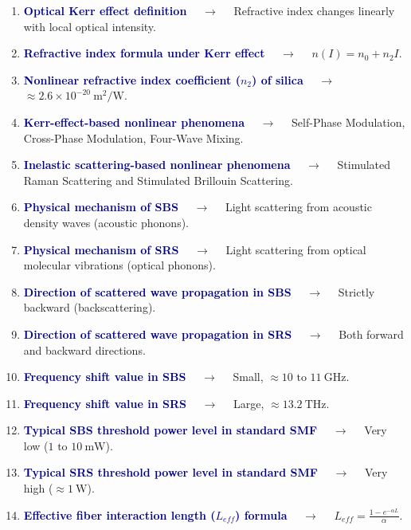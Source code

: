 \documentclass[11pt,a4paper]{article}
\begin{document}
\begin{enumerate}[label=\arabic*., leftmargin=*, labelsep=0.8em, itemsep=0.35em, parsep=0.1em, topsep=0.2em]
  \item \textcolor{darkblue}{\textbf{Optical Kerr effect definition}} $\quad\to\quad$ Refractive index changes linearly with local optical intensity.
  \item \textcolor{darkblue}{\textbf{Refractive index formula under Kerr effect}} $\quad\to\quad$ $n(I) = n_0 + n_2 I$.
  \item \textcolor{darkblue}{\textbf{Nonlinear refractive index coefficient ($n_2$) of silica}} $\quad\to\quad$ $\approx 2.6 \times 10^{-20}\ \text{m}^2/\text{W}$.
  \item \textcolor{darkblue}{\textbf{Kerr-effect-based nonlinear phenomena}} $\quad\to\quad$ Self-Phase Modulation, Cross-Phase Modulation, Four-Wave Mixing.
  \item \textcolor{darkblue}{\textbf{Inelastic scattering-based nonlinear phenomena}} $\quad\to\quad$ Stimulated Raman Scattering and Stimulated Brillouin Scattering.
  \item \textcolor{darkblue}{\textbf{Physical mechanism of SBS}} $\quad\to\quad$ Light scattering from acoustic density waves (acoustic phonons).
  \item \textcolor{darkblue}{\textbf{Physical mechanism of SRS}} $\quad\to\quad$ Light scattering from optical molecular vibrations (optical phonons).
  \item \textcolor{darkblue}{\textbf{Direction of scattered wave propagation in SBS}} $\quad\to\quad$ Strictly backward (backscattering).
  \item \textcolor{darkblue}{\textbf{Direction of scattered wave propagation in SRS}} $\quad\to\quad$ Both forward and backward directions.
  \item \textcolor{darkblue}{\textbf{Frequency shift value in SBS}} $\quad\to\quad$ Small, $\approx 10 \text{ to } 11\ \text{GHz}$.
  \item \textcolor{darkblue}{\textbf{Frequency shift value in SRS}} $\quad\to\quad$ Large, $\approx 13.2\ \text{THz}$.
  \item \textcolor{darkblue}{\textbf{Typical SBS threshold power level in standard SMF}} $\quad\to\quad$ Very low ($1 \text{ to } 10\ \text{mW}$).
  \item \textcolor{darkblue}{\textbf{Typical SRS threshold power level in standard SMF}} $\quad\to\quad$ Very high ($\approx 1\ \text{W}$).
  \item \textcolor{darkblue}{\textbf{Effective fiber interaction length ($L_{eff}$) formula}} $\quad\to\quad$ $L_{eff} = \frac{1 - e^{-\alpha L}}{\alpha}$.

\end{enumerate}
\end{document}

